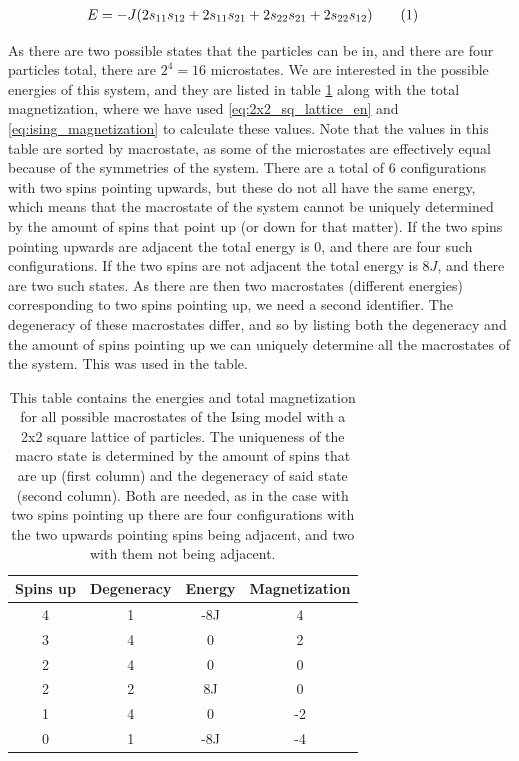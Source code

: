 \documentclass[reprint,english,notitlepage]{revtex4-1}  %
\newcommand\numberthis{\addtocounter{equation}{1}\tag{\theequation}}
\begin{document}
\begin{align*}
E &= -J ( 2s_{11}s_{12} + 2s_{11}s_{21} + 2s_{22}s_{21} + 2s_{22}s_{12}) \numberthis \label{eq:2x2_sq_lattice_en}
\end{align*}

As there are two possible states that the particles can be in, and there are four particles total, there are $2^4 = 16$ microstates. We are interested in the possible energies of this system, and they are listed in table \ref{table:2x2_sq_lattice_en_and_mag} along with the total magnetization, where we have used \eqref{eq:2x2_sq_lattice_en} and \eqref{eq:ising_magnetization} to calculate these values. Note that the values in this table are sorted by macrostate, as some of the microstates are effectively equal because of the symmetries of the system. There are a total of 6 configurations with two spins pointing upwards, but these do not all have the same energy, which means that the macrostate of the system cannot be uniquely determined by the amount of spins that point up (or down for that matter). If the two spins pointing upwards are adjacent the total energy is 0, and there are four such configurations. If the two spins are not adjacent the total energy is $8J$, and there are two such states. As there are then two macrostates (different energies) corresponding to two spins pointing up, we need a second identifier. The degeneracy of these macrostates differ, and so by listing both the degeneracy and the amount of spins pointing up we can uniquely determine all the macrostates of the system. This was used in the table.

\begin{table}[H]
\centering
\caption{This table contains the energies and total magnetization for all possible macrostates of the Ising model with a 2x2 square lattice of particles. The uniqueness of the macro state is determined by the amount of spins that are up (first column) and the degeneracy of said state (second column). Both are needed, as in the case with two spins pointing up there are four configurations with the two upwards pointing spins being adjacent, and two with them not being adjacent.} \label{table:2x2_sq_lattice_en_and_mag}
\begin{tabular}{|c|c|c|c|}
\hline
Spins up & Degeneracy & Energy & Magnetization \\
\hline
4 & 1 & -8J & 4 \\
3 & 4 & 0 & 2 \\
2 & 4 & 0 & 0 \\
2 & 2 & 8J & 0 \\
1 & 4 & 0 & -2 \\
0 & 1 & -8J & -4 \\
\hline
\end{tabular}
\end{table}
\end{document}
